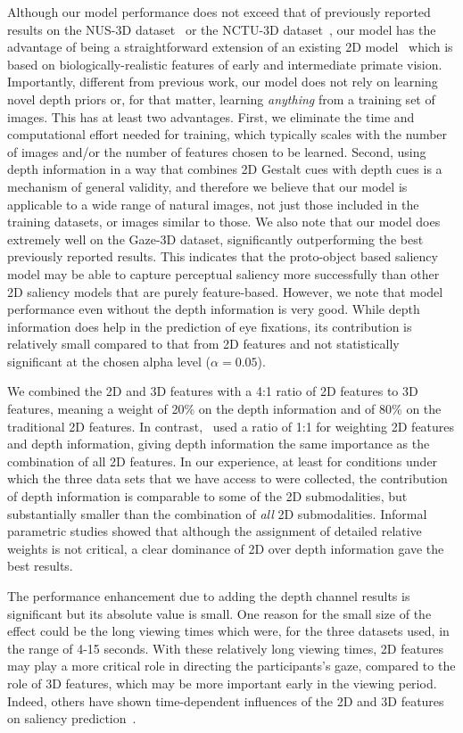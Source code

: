 Although our model performance does not exceed that of previously reported results on the NUS-3D dataset~\citep{Lang_etal12} or the NCTU-3D dataset~\citep{Ma_Hang15}, our model has the advantage of being a straightforward extension of an existing 2D model~\citep{Russell_etal14} which is based on biologically-realistic features of early and intermediate primate vision. Importantly, different from previous work, our model does not rely on learning novel depth priors or, for that matter, learning {\em anything} from a training set of images. This has at least two advantages. First, we eliminate the time and computational effort needed for training, which typically scales with the number of images and/or the number of features chosen to be learned. Second, using depth information in a way that combines 2D Gestalt cues with depth cues is a mechanism of general validity, and therefore we believe that our model is applicable to a wide range of natural images, not just those included in the training datasets, or images similar to those. We also note that our model does extremely well on the Gaze-3D dataset, significantly outperforming the best previously reported results. This indicates that the proto-object based saliency model may be able to capture perceptual saliency more successfully than other 2D saliency models that are purely feature-based. However, we note that model performance even without the depth information is very good. While depth information does help in the prediction of eye fixations, its contribution is relatively small compared to that from 2D features and not statistically significant at the chosen alpha level ($\alpha = 0.05$).

We combined the 2D and 3D features with a 4:1 ratio of 2D features to 3D features, meaning a weight of 20\% on the depth information and of 80\% on the traditional 2D features. In contrast,~\cite{Wang_etal13} used a ratio of 1:1 for weighting 2D features and depth information, giving depth information the same importance as the combination of all 2D features. In our experience, at least for conditions under which the three data sets that we have access to were collected, the contribution of depth information is comparable to some of the 2D submodalities, but substantially smaller than the combination of {\em all} 2D submodalities. Informal parametric studies showed that although the assignment of detailed relative weights is not critical, a clear dominance of 2D over depth information gave the best results. 

The performance enhancement due to adding the depth channel results is significant but its absolute value is small. One reason for the small size of the effect could be the long viewing times which were, for the three datasets used, in the range of 4-15 seconds. With these relatively long viewing times, 2D features may play a more critical role in directing the participants's gaze, compared to the role of 3D features, which may be more important early in the viewing period. Indeed, others have shown time-dependent influences of the 2D and 3D features on saliency prediction~\citep{Gautier_LeMeur12}.

